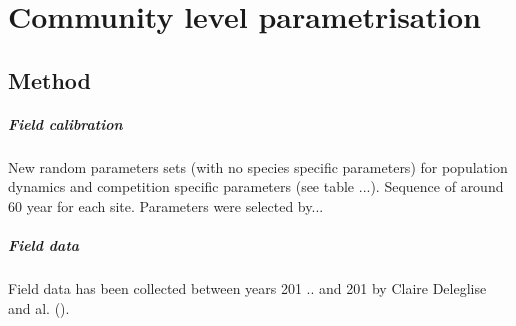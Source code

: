 
%
%

\chapter{Community level parametrisation}

\section{Method}

\paragraph{Field calibration}
New random parameters sets (with no species specific parameters) for population dynamics and competition specific parameters (see table ...).
Sequence of around 60 year for each site. Parameters were selected by...


\paragraph{Field data}
Field data has been collected between years 201 .. and 201 by Claire Deleglise and al. ().

